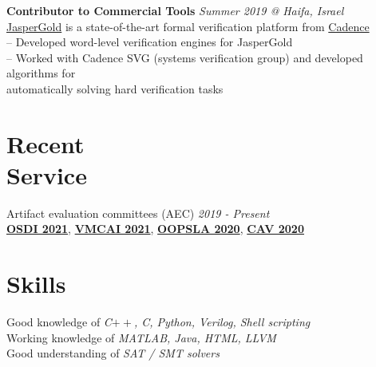 \documentclass[margin,line,letter]{resume}
\begin{document}
\begin{resume}
    \textbf{Contributor to Commercial Tools} \hfill \emph{Summer 2019 @ Haifa, Israel}\\ 
    \phantom{xx}\hspace{1ex} \href{https://www.cadence.com/content/cadence-www/global/en_US/home/tools/system-design-and-verification/formal-and-static-verification/jasper-gold-verification-platform.html}{JasperGold} is a state-of-the-art formal verification platform from \href{https://www.cadence.com/}{Cadence} \\
    \phantom{xx}\hspace{1ex} -- Developed word-level verification engines for JasperGold \\
    \phantom{xx}\hspace{1ex} -- Worked with Cadence SVG (systems verification group) and developed algorithms for \\
    \phantom{xx}\hspace{3ex} automatically solving hard verification tasks

\section{\mysidestyle Recent\\Service}
    Artifact evaluation committees (AEC) \hfill \emph{2019 - Present}\\
    \phantom{x} \href{https://www.usenix.org/conference/osdi21}{\textbf{OSDI 2021}}, \href{https://popl21.sigplan.org/home/VMCAI-2021}{\textbf{VMCAI 2021}}, \href{https://2020.splashcon.org/track/splash-2020-Artifacts}{\textbf{OOPSLA 2020}}, \href{http://i-cav.org/2020/}{\textbf{CAV 2020}}
    
    


\section{\mysidestyle Skills}
    Good knowledge of \emph{C$++$, C, Python, Verilog, Shell scripting} \\
    Working knowledge of \emph{MATLAB, Java, HTML, LLVM}  \\
    Good understanding of \emph{SAT / SMT solvers}


\end{resume}
\end{document}
